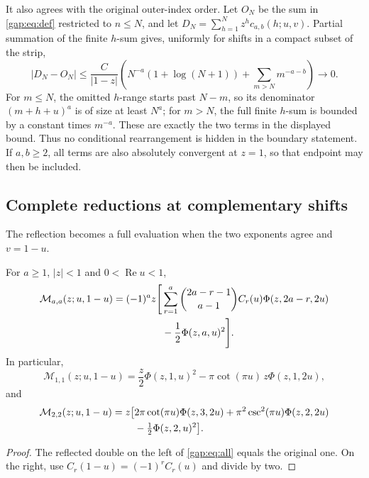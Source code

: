 It also agrees with the original outer-index order. Let $O_N$ be the
sum in \eqref{gap:eq:def} restricted to $n\leq N$, and let
$D_N=\sum_{h=1}^Nz^hc_{a,b}(h;u,v)$. Partial summation of the finite
$h$-sum gives, uniformly for shifts in a compact subset of the strip,
\[
 |D_N-O_N|\leq\frac{C}{|1-z|}
 \left(N^{-a}(1+\log(N+1))+\sum_{m>N}m^{-a-b}\right)
 \longrightarrow0.
\]
For $m\leq N$, the omitted $h$-range starts past $N-m$, so its
denominator $(m+h+u)^a$ is of size at least $N^a$; for $m>N$, the
full finite $h$-sum is bounded by a constant times $m^{-a}$.
These are exactly the two terms in the displayed bound. Thus no
conditional rearrangement is hidden in the boundary statement.
If $a,b\geq2$,
all terms are also absolutely convergent at $z=1$, so that endpoint
may then be included.

\subsection{Complete reductions at complementary shifts}

The reflection becomes a full evaluation when the two exponents
agree and $v=1-u$.

\begin{corollary}\label{gap:cor:diagonal}
For $a\geq1$, $|z|<1$ and $0<\operatorname{Re}u<1$,
\begin{align}
 \mathcal M_{a,a}(z;u,1-u)
 =(-1)^a z\Bigg[
 &\sum_{r=1}^{a}\binom{2a-r-1}{a-1}
        C_r(u)\Phi(z,2a-r,2u)\notag\\
 &-\frac12\Phi(z,a,u)^2\Bigg].
 \label{gap:eq:diagonal}
\end{align}
In particular,
\begin{equation}\label{gap:eq:diagonal11}
 \mathcal M_{1,1}(z;u,1-u)
 =\frac z2\Phi(z,1,u)^2
   -\pi\cot(\pi u)\,z\Phi(z,1,2u),
\end{equation}
and
\begin{align}
 \mathcal M_{2,2}(z;u,1-u)
 =z\bigl[&2\pi\cot(\pi u)\Phi(z,3,2u)
          +\pi^2\csc^2(\pi u)\Phi(z,2,2u)\notag\\
          &-\tfrac12\Phi(z,2,u)^2\bigr].
 \label{gap:eq:diagonal22}
\end{align}
\end{corollary}
\begin{proof}
The reflected double on the left of \eqref{gap:eq:all} equals the
original one. On the right, use $C_r(1-u)=(-1)^rC_r(u)$ and divide
by two.
\end{proof}

